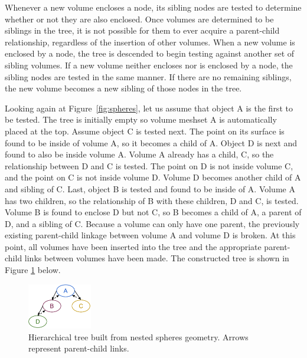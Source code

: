 \documentclass{anstrans}
\begin{document}
Whenever a new volume encloses a node, its sibling nodes are tested to
determine whether or not they are also enclosed.  Once volumes are
determined to be siblings in the tree, it is not possible for them to ever
acquire a parent-child relationship, regardless of the insertion of other
volumes.  When a new volume is enclosed by a node, the tree is descended to
begin testing against another set of sibling volumes.  If a new volume neither
encloses nor is enclosed by a node, the sibling nodes are tested in the same
manner.  If there are no remaining siblings, the new volume becomes a new
sibling of those nodes in the tree.

Looking again at Figure~\ref{fig:spheres}, let us assume that object A is the
first to be tested. The tree is initially empty so volume meshset A is
automatically placed at the top.  Assume object C is tested next.  The point
on its surface is found to be inside of volume A, so it becomes a child of A.
Object D is next and found to also be inside volume A.  Volume A already has 
a child, C, so the relationship between D and C is tested.  The point on D is not 
inside volume C, and the point on C is not inside volume D.
Volume D becomes another child of A and sibling of C.
Last, object B is tested and found to be inside of A.  Volume A has two children, 
so the relationship of B with these children, D and C, is tested.  Volume B is
found to enclose D but not C, so B becomes a child of A, a parent of D, and a sibling
of C.  Because a volume can only have one parent, the previously existing 
parent-child linkage between volume A and volume D is broken.  At this point, 
all volumes have been inserted into the tree and the appropriate parent-child
links between volumes have been made.  The constructed tree is shown in Figure \ref{fig:tree} below.

\begin{figure}[ht] %
  \centering
  \includegraphics[width=0.25\textwidth]{../figs/tree.png}
  \caption{Hierarchical tree built from nested spheres geometry.  Arrows represent parent-child links.}
  \label{fig:tree}
\end{figure}
\end{document}
